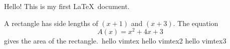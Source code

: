 \documentclass[11pt]{article}
\begin{document}
Hello! This is my first \LaTeX\ document. 

A rectangle has side lengths of $(x+1)$ and $(x+3)$.
The equation \[{A (x) = x^2 + 4x + 3}\] gives the area of the rectangle.\
hello vimtex
hello vimtex2
hello vimtex3
\end{document}
